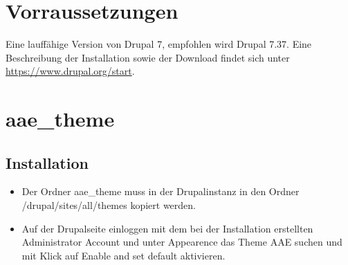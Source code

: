 \documentclass{swp}
\begin{document}
\\\\\\\\\\

\tableofcontents
\newpage
\section{Vorraussetzungen}
Eine lauff\"ahige Version von Drupal 7, empfohlen wird Drupal 7.37. Eine Beschreibung der Installation sowie der Download findet sich unter \url{https://www.drupal.org/start}.
\section{aae\_{}theme}
\subsection{Installation}
\begin{itemize}
\item Der Ordner \glqq aae\_{}theme\grqq{} muss in der Drupalinstanz in den Ordner \glqq /drupal/sites/all/themes\grqq{} kopiert werden.
\item Auf der Drupalseite einloggen mit dem bei der Installation erstellten Administrator Account und unter \glqq Appearence\grqq{} das Theme \glqq AAE\grqq{} suchen und mit Klick auf \glqq Enable and set default\grqq{} aktivieren.
\end{itemize}
\end{document}
